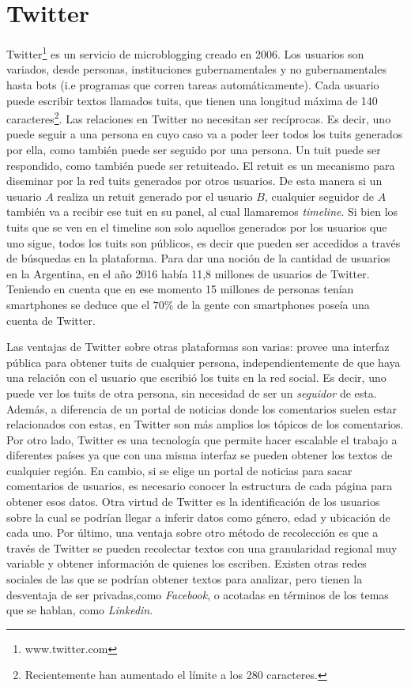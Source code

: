 \section{Twitter}
Twitter\footnote{www.twitter.com} es un servicio de microblogging creado en 2006. Los usuarios son variados, desde personas, instituciones gubernamentales y no gubernamentales hasta bots (i.e programas que corren tareas automáticamente). Cada usuario puede escribir textos llamados tuits, que tienen una longitud máxima de 140 caracteres\footnote{Recientemente han aumentado el límite a los 280 caracteres.}. Las relaciones en Twitter no necesitan ser recíprocas. Es decir, uno puede seguir a una persona en cuyo caso va a poder leer todos los tuits generados por ella, como también puede ser seguido por una persona. Un tuit puede ser respondido, como también puede ser retuiteado. El retuit es un mecanismo para diseminar por la red tuits generados por otros usuarios. De esta manera si un usuario $A$ realiza un retuit generado por el usuario $B$, cualquier seguidor de $A$ también va a recibir ese tuit en su panel, al cual llamaremos \textit{timeline}. Si bien los tuits que se ven en el timeline son solo aquellos generados por los usuarios que uno sigue, todos los tuits son públicos, es decir que pueden ser accedidos a través de búsquedas en la plataforma.
Para dar una noción de la cantidad de usuarios en la Argentina, en el año 2016 había 11,8 millones de usuarios de Twitter. Teniendo en cuenta que en ese momento 15 millones de personas tenían smartphones se deduce que el $70$\% de la gente con smartphones poseía una cuenta de Twitter.%

Las ventajas de Twitter sobre otras plataformas son varias: provee una interfaz pública para obtener tuits de cualquier persona, independientemente de que haya una relación con el usuario que escribió los tuits en la red social. Es decir, uno puede ver los tuits de otra persona, sin necesidad de ser un \textit{seguidor} de esta. Además, a diferencia de un portal de noticias donde los comentarios suelen estar relacionados con estas, en Twitter son más amplios los tópicos de los comentarios.
Por otro lado, Twitter es una tecnología que permite hacer escalable el trabajo a diferentes países ya que con una misma interfaz se pueden obtener los textos de cualquier región. En cambio, si se elige un portal de noticias para sacar comentarios de usuarios, es necesario conocer la estructura de cada página para obtener esos datos.
Otra virtud de Twitter es la identificación de los usuarios sobre la cual se podrían llegar a inferir datos como género, edad y ubicación de cada uno.
Por último, una ventaja sobre otro método de recolección es que a través de Twitter se pueden recolectar textos con una granularidad regional muy variable y obtener información de quienes los escriben.
Existen otras redes sociales de las que se podrían obtener textos para analizar, pero tienen la desventaja de ser privadas,como \textit{Facebook}, o acotadas en términos de los temas que se hablan, como \textit{Linkedin}. 

